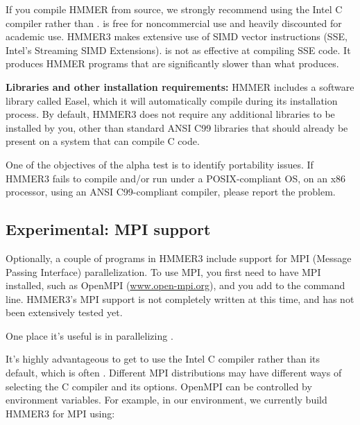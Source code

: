 If you compile HMMER from source, we strongly recommend using the
Intel C compiler  rather than .  is free
for noncommercial use and heavily discounted for academic use.  HMMER3
makes extensive use of SIMD vector instructions (SSE, Intel's
Streaming SIMD Extensions).  is not as effective at
compiling SSE code. It produces HMMER programs that are significantly
slower than what  produces.

\textbf{Libraries and other installation requirements:} HMMER includes
a software library called Easel, which it will automatically compile
during its installation process.  By default, HMMER3 does not require
any additional libraries to be installed by you, other than standard
ANSI C99 libraries that should already be present on a system that can
compile C code.

\begin{sidebar}
One of the objectives of the alpha test is to identify portability
issues. If HMMER3 fails to compile and/or run under a POSIX-compliant
OS, on an x86 processor, using an ANSI C99-compliant compiler, please
report the problem.
\end{sidebar}



\subsection{Experimental: MPI support}

Optionally, a couple of programs in HMMER3 include support for MPI
(Message Passing Interface) parallelization. To use MPI, you first
need to have MPI installed, such as OpenMPI (\url{www.open-mpi.org}),
and you add  to the  command
line. HMMER3's MPI support is not completely written at this time, and
has not been extensively tested yet. 

One place it's useful is in parallelizing .

It's highly advantageous to get  to use the Intel C
compiler rather than its default, which is often . Different
MPI distributions may have different ways of selecting the C compiler
and its options. OpenMPI can be controlled by environment variables.
For example, in our environment, we currently build HMMER3 for MPI
using:

\\
\\
\\
\\









